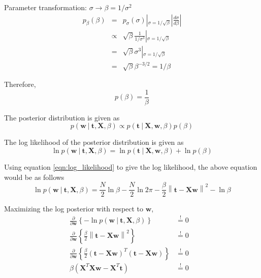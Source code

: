 \documentclass[11pt]{article}
\newcommand\given[1][]{\:#1\vert\:}
\newcommand{\norm}[1]{\left\lVert#1\right\rVert}
\begin{document}
Parameter transformation: $\sigma\to\beta=1/\sigma^2$
  \begin{eqnarray*}
    p_\beta(\beta) &=& p_\sigma(\sigma)\left|_{\sigma=1/\sqrt{\beta}}\right. \left|\frac{d\sigma}{d\beta} \right| \\
    &\propto& \sqrt{\beta} \frac{1}{1/\sigma^3}\left|_{\sigma=1/\sqrt\beta}\right. \\
    &=& \sqrt{\beta} \sigma^3\left|_{\sigma=1/\sqrt\beta}\right. \\
    &=& \sqrt{\beta} \beta^{-3/2} = 1 / \beta
  \end{eqnarray*}

Therefore,
\begin{equation} \label{eqn:beta_jeffreys}
    p(\beta) = \frac{1}{\beta}
\end{equation}

The posterior distribution is given as
\begin{equation}
    p(\bm{w} \given \bm{t}, \bm{X}, \beta) \propto p(\bm{t} \given \bm{X}, \bm{w}, \beta) p(\beta)
\end{equation}

The log likelihood of the posterior distribution is given as
\begin{equation} 
    \ln{p(\bm{w} \given \bm{t}, \bm{X}, \beta)} = \ln{p(\bm{t} \given \bm{X}, \bm{w}, \beta)} + \ln{p(\beta)}
\end{equation}

Using equation \ref{eqn:log_likelihood} to give the log likelihood, the above equation would be as follows
\begin{equation} \label{eqn:log_posterior_jeffreys}
    \ln{p(\bm{w} \given \bm{t}, \bm{X}, \beta)} = \frac{N}{2}\ln{\beta} - \frac{N}{2}\ln{2\pi} - \frac{\beta}{2} \norm{\bm{t} - \bm{Xw}}^2 - \ln{\beta}
\end{equation}

Maximizing the log posterior with respect to $\bm{w}$,
\begin{eqnarray}
    \frac{\partial }{\partial  \bm{w}} \left\{ -\ln{p(\bm{w} \given \bm{t}, \bm{X}, \beta)} \right\} 
    &\overset{!}{=} 0& \\
    \frac{\partial }{\partial \bm{w}} \left\{\frac{\beta}{2} \norm{\bm{t} - \bm{Xw}}^2  \right\}
    &\overset{!}{=} 0& \\
    \frac{\partial }{\partial \bm{w}} \left\{\frac{\beta}{2} \left(\bm{t} - \bm{X}\bm{w}\right)^T \left(\bm{t} - \bm{X}\bm{w}\right) \right\}
    &\overset{!}{=} 0& \\
    \beta \left( \bm{X}^T\bm{X}\bm{w} - \bm{X}^T \bm{t} \right) 
    &\overset{!}{=} 0& 
\end{eqnarray}
\end{document}
